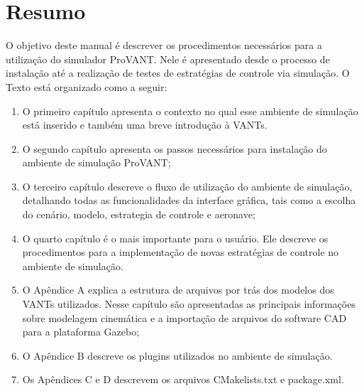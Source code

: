 \chapter*{Resumo}

O objetivo deste manual é descrever os procedimentos necessários para a utilização do simulador ProVANT. Nele é apresentado desde o processo de instalação até a realização de testes de estratégias de controle via simulação. O Texto está organizado como a seguir:

\begin{enumerate}
	\item O primeiro capítulo apresenta o contexto no qual esse ambiente de simulação está inserido e também uma breve introdução à VANTs.
	\item O segundo capítulo apresenta os passos necessários para instalação do ambiente de simulação ProVANT;
	\item O terceiro capítulo descreve o fluxo de utilização do ambiente de simulação, detalhando todas as funcionalidades da interface gráfica, tais como a escolha do cenário, modelo, estrategia de controle e aeronave;
	\item O quarto capítulo é o mais importante para o usuário. Ele descreve os procedimentos para a implementação de novas estratégias de controle no ambiente de simulação. 
	\item O Apêndice A explica a estrutura de arquivos por trás dos modelos dos VANTs utilizados. Nesse capítulo são apresentadas as principais informações sobre modelagem cinemática e a importação de arquivos do software CAD para a plataforma Gazebo; 
	\item O Apêndice B descreve os plugins utilizados no ambiente de simulação. 
	\item Os Apêndices C e D descrevem os arquivos CMakelists.txt e package.xml. 
\end{enumerate}